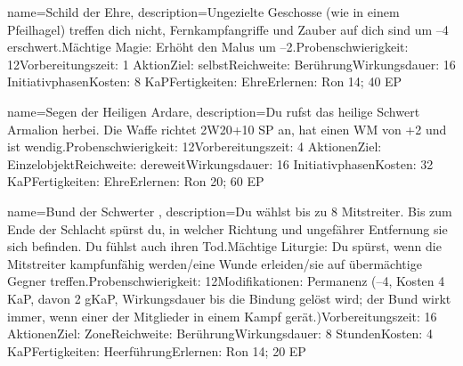 {
    name={Schild der Ehre},
    description={Ungezielte Geschosse (wie in einem Pfeilhagel) treffen dich nicht, Fernkampfangriffe und Zauber auf dich sind um –4 erschwert.\newline Mächtige Magie: Erhöht den Malus um –2.\newline Probenschwierigkeit: 12\newline Vorbereitungszeit: 1 Aktion\newline Ziel: selbst\newline Reichweite: Berührung\newline Wirkungsdauer: 16 Initiativphasen\newline Kosten: 8 KaP\newline Fertigkeiten: Ehre\newline Erlernen: Ron 14; 40 EP}
}


{
    name={Segen der Heiligen Ardare},
    description={Du rufst das heilige Schwert Armalion herbei. Die Waffe richtet 2W20+10 SP an, hat einen WM von +2 und ist wendig.\newline Probenschwierigkeit: 12\newline Vorbereitungszeit: 4 Aktionen\newline Ziel: Einzelobjekt\newline Reichweite: dereweit\newline Wirkungsdauer: 16 Initiativphasen\newline Kosten: 32 KaP\newline Fertigkeiten: Ehre\newline Erlernen: Ron 20; 60 EP}
}


{
    name={Bund der Schwerter },
    description={Du wählst bis zu 8 Mitstreiter. Bis zum Ende der Schlacht spürst du, in welcher Richtung und ungefährer Entfernung sie sich befinden. Du fühlst auch ihren Tod.\newline Mächtige Liturgie: Du spürst, wenn die Mitstreiter kampfunfähig werden/eine Wunde erleiden/sie auf übermächtige Gegner treffen.\newline Probenschwierigkeit: 12\newline Modifikationen: Permanenz (–4, Kosten 4 KaP, davon 2 gKaP, Wirkungsdauer bis die Bindung gelöst wird; der Bund wirkt immer, wenn einer der Mitglieder in einem Kampf gerät.)\newline Vorbereitungszeit: 16 Aktionen\newline Ziel: Zone\newline Reichweite: Berührung\newline Wirkungsdauer: 8 Stunden\newline Kosten: 4 KaP\newline Fertigkeiten: Heerführung\newline Erlernen: Ron 14; 20 EP}
}


